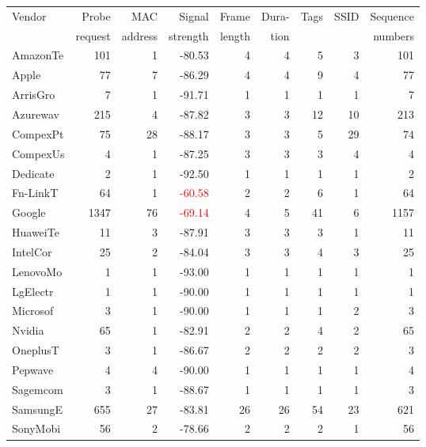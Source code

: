 \begin{table}
\footnotesize
\begin{center}
  \begin{tabular}{lrrrrrrrr}
  \toprule
  Vendor & Probe & MAC & Signal & Frame & Dura-& Tags & SSID & Sequence \\ 
  & request & address & strength & length &  tion &  &  & numbers \\ 
  \midrule
  AmazonTe &  101 &   1 & -80.53 &   4 &   4 &   5 &   3 & 101 \\ 
  Apple    &   77 &   7 & -86.29 &   4 &   4 &   9 &   4 &  77 \\ 
  ArrisGro &    7 &   1 & -91.71 &   1 &   1 &   1 &   1 &   7 \\ 
  Azurewav &  215 &   4 & -87.82 &   3 &   3 &  12 &  10 & 213 \\ 
  CompexPt &   75 &  28 & -88.17 &   3 &   3 &   5 &  29 &  74 \\ 
  CompexUs &    4 &   1 & -87.25 &   3 &   3 &   3 &   4 &   4 \\ 
  Dedicate &    2 &   1 & -92.50 &   1 &   1 &   1 &   1 &   2 \\ 
  Fn-LinkT &   64 &   1 & \textcolor{red}{-60.58} &   2 &   2 &   6 &   1 &  64 \\ 
  Google   & 1347 &  76 & \textcolor{red}{-69.14} &   4 &   5 &  41 &   6 & 1157 \\ 
  HuaweiTe &   11 &   3 & -87.91 &   3 &   3 &   3 &   1 &  11 \\ 
  IntelCor &   25 &   2 & -84.04 &   3 &   3 &   4 &   3 &  25 \\ 
  LenovoMo &    1 &   1 & -93.00 &   1 &   1 &   1 &   1 &   1 \\ 
  LgElectr &    1 &   1 & -90.00 &   1 &   1 &   1 &   1 &   1 \\ 
  Microsof &    3 &   1 & -90.00 &   1 &   1 &   1 &   2 &   3 \\ 
  Nvidia   &   65 &   1 & -82.91 &   2 &   2 &   4 &   2 &  65 \\ 
  OneplusT &    3 &   1 & -86.67 &   2 &   2 &   2 &   2 &   3 \\ 
  Pepwave  &    4 &   4 & -90.00 &   1 &   1 &   1 &   1 &   4 \\ 
  Sagemcom &    3 &   1 & -88.67 &   1 &   1 &   1 &   1 &   3 \\ 
  SamsungE &  655 &  27 & -83.81 &  26 &  26 &  54 &  23 & 621 \\ 
  SonyMobi &   56 &   2 & -78.66 &   2 &   2 &   2 &   1 &  56 \\ 

\end{tabular}
\end{center}
\end{table}
